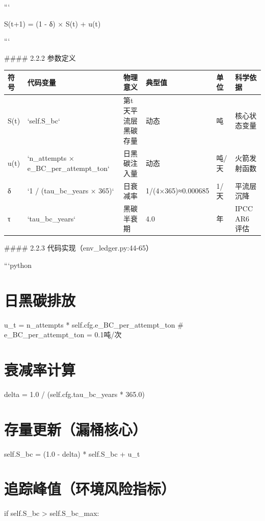 \documentclass[a4paper,12pt]{article}
\begin{document}
\par
```

\par
S(t+1) = (1 - δ) × S(t) + u(t)

\par
```

\par
#### 2.2.2 参数定义

\par
\begin{center}
\begin{longtable}{|l|l|l|l|l|}
\hline
符号 & 代码变量 & 物理意义 & 典型值 & 单位 & 科学依据 \\ \hline
S(t) & `self.S_bc` & 第t天平流层黑碳存量 & 动态 & 吨 & 核心状态变量 \\ \hline
u(t) & `n_attempts × e_BC_per_attempt_ton` & 日黑碳注入量 & 动态 & 吨/天 & 火箭发射函数 \\ \hline
δ & `1 / (tau_bc_years × 365)` & 日衰减率 & 1/(4×365)≈0.000685 & 1/天 & 平流层沉降 \\ \hline
τ & `tau_bc_years` & 黑碳半衰期 & 4.0 & 年 & IPCC AR6 评估 \\ \hline
\end{longtable}
\end{center}
#### 2.2.3 代码实现（env\_ledger.py:44-65）

\par
```python

\par
\section{日黑碳排放}
u\_t = n\_attempts * self.cfg.e\_BC\_per\_attempt\_ton  # e\_BC\_per\_attempt\_ton = 0.1吨/次

\par
\section{衰减率计算}
delta = 1.0 / (self.cfg.tau\_bc\_years * 365.0)

\par
\section{存量更新（漏桶核心）}
self.S\_bc = (1.0 - delta) * self.S\_bc + u\_t

\par
\section{追踪峰值（环境风险指标）}
if self.S\_bc > self.S\_bc\_max:
\end{document}
